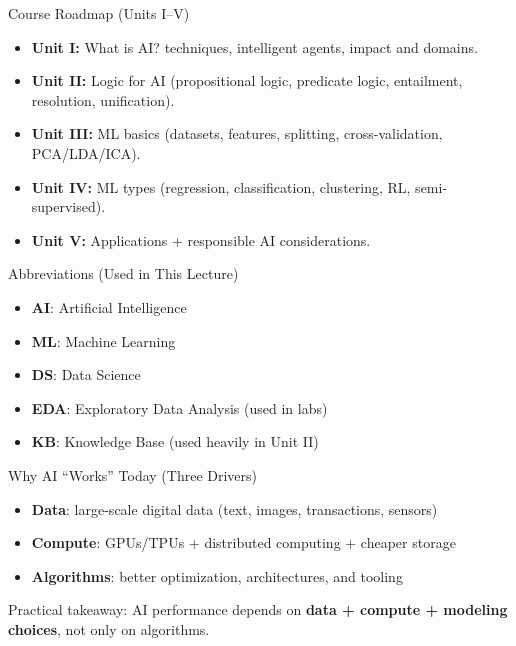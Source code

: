 \documentclass[aspectratio=169]{beamer}
\begin{document}
\begin{frame}{Course Roadmap (Units I--V)}
  \begin{itemize}[<+->]
    \item \textbf{Unit I:} What is AI? techniques, intelligent agents, impact and domains.
    \item \textbf{Unit II:} Logic for AI (propositional logic, predicate logic, entailment, resolution, unification).
    \item \textbf{Unit III:} ML basics (datasets, features, splitting, cross-validation, PCA/LDA/ICA).
    \item \textbf{Unit IV:} ML types (regression, classification, clustering, RL, semi-supervised).
    \item \textbf{Unit V:} Applications + responsible AI considerations.
  \end{itemize}
\end{frame}

\begin{frame}{Abbreviations (Used in This Lecture)}
  \begin{itemize}[<+->]
    \item \textbf{AI}: Artificial Intelligence
    \item \textbf{ML}: Machine Learning
    \item \textbf{DS}: Data Science
    \item \textbf{EDA}: Exploratory Data Analysis (used in labs)
    \item \textbf{KB}: Knowledge Base (used heavily in Unit II)
  \end{itemize}
\end{frame}

\begin{frame}{Why AI ``Works'' Today (Three Drivers)}
  \begin{itemize}[<+->]
    \item \textbf{Data}: large-scale digital data (text, images, transactions, sensors)
    \item \textbf{Compute}: GPUs/TPUs + distributed computing + cheaper storage
    \item \textbf{Algorithms}: better optimization, architectures, and tooling
  \end{itemize}
  \vspace{0.4em}
  Practical takeaway: AI performance depends on \textbf{data + compute + modeling choices}, not only on algorithms.
\end{frame}
\end{document}

